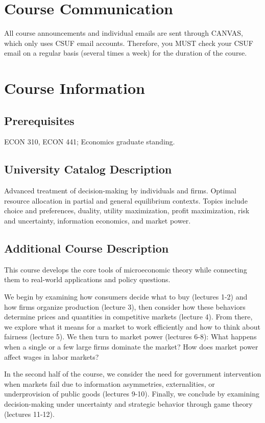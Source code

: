 \documentclass{syllabus}
\begin{document}
\section*{Course Communication}
All course announcements and individual emails are sent through CANVAS, which only uses CSUF email accounts. Therefore, you MUST check your CSUF email on a regular basis (several times a week) for the duration of the course.


\section*{Course Information}

\subsection*{Prerequisites}
ECON 310, ECON 441; Economics graduate standing.

\subsection*{University Catalog Description}

Advanced treatment of decision-making by individuals and firms. Optimal resource allocation in partial and general equilibrium contexts. Topics include choice and preferences, duality, utility maximization, profit maximization, risk and uncertainty, information economics, and market power.

\subsection*{Additional Course Description}

This course develops the core tools of microeconomic theory while connecting them to real-world applications and policy questions. 

We begin by examining how consumers decide what to buy (lectures 1-2) and how firms organize production (lecture 3), then consider how these behaviors determine prices and quantities in competitive markets (lecture 4). From there, we explore what it means for a market to work efficiently and how to think about fairness (lecture 5). We then turn to market power (lectures 6-8): What happens when a single or a few large firms dominate the market? How does market power affect wages in labor markets? 

In the second half of the course, we consider the need for government intervention when markets fail due to information asymmetries, externalities, or underprovision of public goods (lectures 9-10). Finally, we conclude by examining decision-making under uncertainty and strategic behavior through game theory (lectures 11-12).
\end{document}
